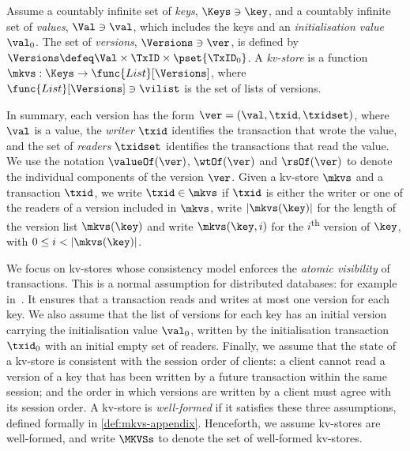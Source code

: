 \begin{definition}[Kv-stores]
\label{def:his_heap}
\label{def:mkvs}
Assume a countably infinite set of \emph{keys}, $\Keys \ni \key$, 
and a countably infinite set of  \emph{values}, $\Val \ni \val$, 
which includes the keys and an \emph{initialisation value} $\val_0$.
The set of \emph{versions}, $\Versions \ni \ver$, is defined by $\Versions \defeq \Val \times \TxID \times \pset{\TxID_{0}}$. 
A \emph{kv-store} 
is a function $\mkvs: \Keys \to \func{List}[\Versions]$, 
where $\func{List}[\Versions] \ni \vilist$ is the set of lists of versions. %
\end{definition}

In summary, each version has the form 
$\ver = (\val, \txid, \txidset)$, where $\val$ is
a value, the \emph{writer} $\txid$ identifies the transaction that
wrote the value,  and the set of \emph{readers} $\txidset$ identifies the
transactions that read the value. We use the notation 
$\valueOf(\ver)$,
$\wtOf(\ver)$ and $\rsOf(\ver)$ to denote
the individual components of the version $\ver$.
Given a kv-store $\mkvs$ and a transaction $\txid$, we write 
$\txid \in \mkvs$ if $\txid$ 
is either the writer or 
one of the readers of a version included in $\mkvs$, 
write $\lvert \mkvs(\key) \rvert$ for the length of the version
list $\mkvs(\key)$
and write $\mkvs(\key, i)$ for the $i$\textsuperscript{th} version of $\key$, 
with $0 \leq i < \lvert \mkvs(\key) \rvert$.


We focus on kv-stores whose consistency model enforces the
\emph{atomic visibility} of transactions. This is a normal assumption for 
distributed databases: for example in~\cite{ramp,rola,cops,wren,redblue,PSI,NMSI,gdur,clocksi,distrsi}.
It  ensures that
a transaction reads and writes at most one version for each key.
We also assume that 
the list of versions for each key has an initial version 
carrying the initialisation value $\val_0$,  written by the 
initialisation transaction $\txid_0$ with an initial empty set of
readers.  Finally, we assume that the state of a kv-store is
consistent with the session order of clients: a client cannot read a
version of a key that has been written by a future transaction within
the same session; and the order in which versions are written by a
client must agree with its session order.  A kv-store is
\emph{well-formed} if it satisfies these three assumptions, defined
formally in \cref{def:mkvs-appendix}.  Henceforth, we assume kv-stores
are well-formed, and write $\MKVSs$ to denote the set of well-formed
kv-stores.

